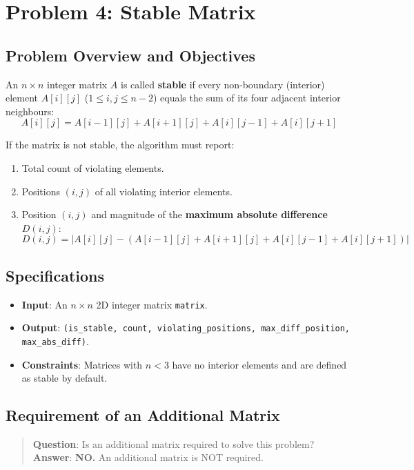 \section{Problem 4: Stable Matrix}

\subsection{Problem Overview and Objectives}
An $n \times n$ integer matrix $A$ is called \textbf{stable} if every non-boundary (interior) element $A[i][j]$ ($1 \le i, j \le n-2$) equals the sum of its four adjacent interior neighbours:
\[
A[i][j] = A[i-1][j] + A[i+1][j] + A[i][j-1] + A[i][j+1]
\]

If the matrix is not stable, the algorithm must report:
\begin{enumerate}
    \item Total count of violating elements.
    \item Positions $(i, j)$ of all violating interior elements.
    \item Position $(i, j)$ and magnitude of the \textbf{maximum absolute difference} $D(i, j)$:
    \[
    D(i, j) = \left| A[i][j] - \left( A[i-1][j] + A[i+1][j] + A[i][j-1] + A[i][j+1] \right) \right|
    \]
\end{enumerate}

\subsection{Specifications}
\begin{itemize}
    \item \textbf{Input}: An $n \times n$ 2D integer matrix \texttt{matrix}.
    \item \textbf{Output}: \texttt{(is\_stable, count, violating\_positions, max\_diff\_position, max\_abs\_diff)}.
    \item \textbf{Constraints}: Matrices with $n < 3$ have no interior elements and are defined as stable by default.
\end{itemize}

\subsection{Requirement of an Additional Matrix}
\begin{quote}
\textbf{Question}: Is an additional matrix required to solve this problem? \\
\textbf{Answer}: \textbf{NO.} An additional matrix is NOT required.
\end{quote}

